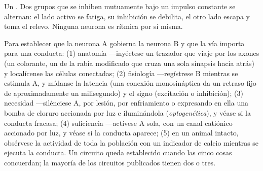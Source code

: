 \begin{omfigure}

{\small Un . Dos grupos que se inhiben
mutuamente bajo un impulso constante se alternan: el lado activo se
fatiga, su inhibición se debilita, el otro lado escapa y toma el
relevo. Ninguna neurona es rítmica por sí misma.}
\end{omfigure}

\begin{method}\label{met:b3:nervous-systems:tracing}
Para establecer que la neurona A gobierna la neurona B y que la vía
importa para una conducta: (1) anatomía ---inyéctese un trazador que
viaje por los axones (un colorante, un  de la rabia modificado que
cruza una sola sinapsis hacia atrás) y localícense las células
conectadas; (2) fisiología ---regístrese B mientras se estimula A, y
mídanse la latencia (una conexión monosináptica da un retraso fijo de
aproximadamente un milisegundo) y el signo (excitación o inhibición);
(3) necesidad ---silénciese A, por lesión, por enfriamiento o
expresando en ella una bomba de cloruro accionada por luz e
iluminándola (\emph{optogenética}), y véase si la conducta fracasa; (4)
suficiencia ---actívese A sola, con un canal catiónico accionado por
luz, y véase si la conducta aparece; (5) en un animal intacto,
obsérvese la actividad de toda la población con un indicador de calcio
mientras se ejecuta la conducta. Un circuito queda establecido cuando
las cinco cosas concuerdan; la mayoría de los circuitos publicados
tienen dos o tres.
\end{method}

